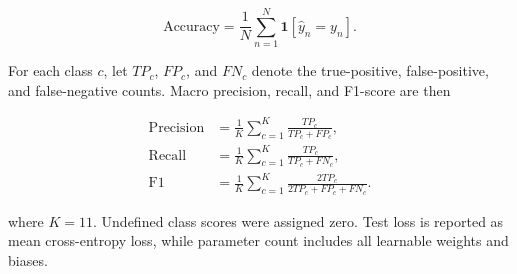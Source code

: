 \documentclass[journal,article,submit,moreauthors]{Definitions/mdpi}
\begin{document}
    \begin{equation}
        \mathrm{Accuracy}=\frac{1}{N}\sum_{n=1}^{N}
        \mathbf{1}\!\left[\hat{y}_n=y_n\right].
        \label{eq:accuracy}
    \end{equation}

    For each class $c$, let $TP_c$, $FP_c$, and $FN_c$ denote the true-positive, 
    false-positive, and false-negative counts. Macro precision, recall, and 
    F1-score are then

    \begin{align}
        \mathrm{Precision}&=\frac{1}{K}\sum_{c=1}^{K}
            \frac{TP_c}{TP_c+FP_c}, \label{eq:precision}\\
        \mathrm{Recall}&=\frac{1}{K}\sum_{c=1}^{K}
            \frac{TP_c}{TP_c+FN_c}, \label{eq:recall}\\
        \mathrm{F1}&=\frac{1}{K}\sum_{c=1}^{K}
            \frac{2TP_c}{2TP_c+FP_c+FN_c}. \label{eq:f1}
    \end{align}

    where $K=11$. Undefined class scores were assigned zero. Test loss is
    reported as mean cross-entropy loss, while parameter count includes all
    learnable weights and biases.
\end{document}
